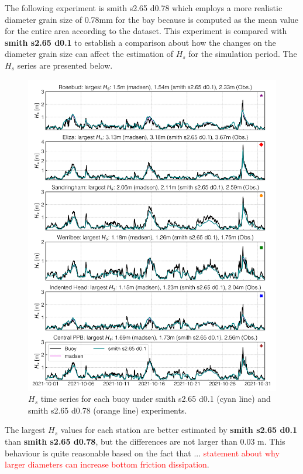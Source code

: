\documentclass[12pt]{article}
\begin{document}
The following experiment is smith s2.65 d0.78 which employs a more realistic diameter grain size of 0.78mm for the bay because is computed as the mean value for the entire area according to the dataset. This experiment is compared with \textbf{smith s2.65 d0.1} to establish a comparison about how the changes on the diameter grain size can affect the estimation of $H_s$ for the simulation period. The $H_s$ series are presented below.

\begin{figure}[h]
    \centering
    \includegraphics[scale=0.7]{plots/hs_series/madsen_vs_smith s2.65 d0.1_vert.png}
    \caption{$H_{s}$ time series for each buoy under smith s2.65 d0.1 (cyan line) and smith s2.65 d0.78 (orange line) experiments.}
    \label{fig:hs_smith_def_vs_smith_0.78}
\end{figure}

The largest $H_s$ values for each station are better estimated by \textbf{smith s2.65 d0.1} than \textbf{smith s2.65 d0.78}, but the differences are not larger than 0.03 m. This behaviour is quite reasonable based on the fact that ... \textcolor{red}{statement about why larger diameters can increase bottom friction dissipation}.
\end{document}
